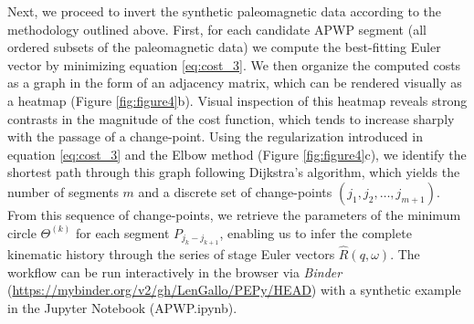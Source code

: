 \documentclass{article} %
\begin{document}
Next, we proceed to invert the synthetic paleomagnetic data according to the methodology outlined above. First, for each candidate APWP segment (all ordered subsets of the paleomagnetic data) we compute the best-fitting Euler vector by minimizing equation \eqref{eq:cost_3}. We then organize the computed costs as a graph in the form of an adjacency matrix, which can be rendered visually as a heatmap (Figure \ref{fig:figure4}b). Visual inspection of this heatmap reveals strong contrasts in the magnitude of the cost function, which tends to increase sharply with the passage of a change-point. Using the regularization introduced in equation \eqref{eq:cost_3} and the Elbow method (Figure \ref{fig:figure4}c), we identify the shortest path through this graph following Dijkstra's algorithm, which yields the number of segments $m$ and a discrete set of change-points $(j_1, j_2, \ldots, j_{m+1})$. From this sequence of change-points, we retrieve the parameters of the minimum circle $\Theta^{(k)}$ for each segment $P_{j_k - j_{k+1}}$, enabling us to infer the complete kinematic history through the series of stage Euler vectors $\hat R (q,\omega)$. The workflow can be run interactively in the browser via \textit{Binder} (\url{https://mybinder.org/v2/gh/LenGallo/PEPy/HEAD}) with a synthetic example in the Jupyter Notebook (APWP.ipynb).
\end{document}
